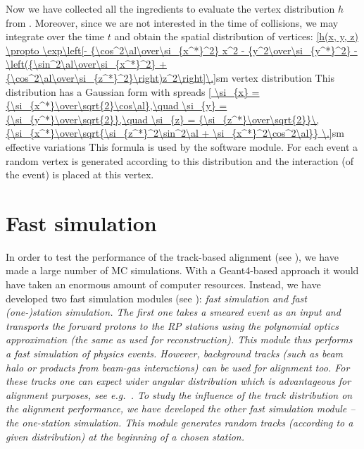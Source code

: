 Now we have collected all the ingredients to evaluate the vertex distribution $h$ from . Moreover, since we are not interested in the time of collisions, we may integrate over the time $t$ and obtain the spatial distribution of vertices:
\eqref{h(x, y, z) \propto \exp\left[- {\cos^2\al\over\si_{x^*}^2} x^2 - {y^2\over\si_{y^*}^2} - \left({\sin^2\al\over\si_{x^*}^2} + {\cos^2\al\over\si_{z^*}^2}\right)z^2\right]\.}{sm vertex distribution}
This distribution has a Gaussian form with spreads
\eqref{
	\si_{x} = {\si_{x^*}\over\sqrt{2}\cos\al},\quad
	\si_{y} = {\si_{y^*}\over\sqrt{2}},\quad
	\si_{z} = {\si_{z^*}\over\sqrt{2}}\,{\si_{x^*}\over\sqrt{\si_{z^*}^2\sin^2\al + \si_{x^*}^2\cos^2\al}} \.}{sm effective variations}
This formula is used by the software module. For each event a random vertex is generated according to this distribution and the interaction (of the event) is placed at this vertex.


\section[fast simu]{Fast simulation}

In order to test the performance of the track-based alignment (see ), we have made a large number of MC simulations. With a Geant4-based approach it would have taken an enormous amount of computer resources. Instead, we have developed two fast simulation modules (see ): \em{fast simulation} and \em{fast (one-)station simulation}. The first one takes a smeared event as an input and transports the forward protons to the RP stations using the polynomial optics approximation (the same as used for reconstruction). This module thus performs a fast simulation of physics events. However, background tracks (such as beam halo or products from beam-gas interactions) can be used for alignment too. For these tracks one can expect wider angular distribution which is advantageous for alignment purposes, see e.g.~. To study the influence of the track distribution on the alignment performance, we have developed the other fast simulation module -- the one-station simulation. This module generates random tracks (according to a given distribution) at the beginning of a chosen station.

